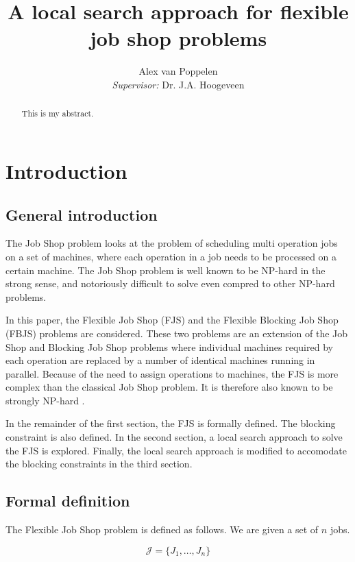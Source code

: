 \documentclass[a4paper,10pt]{article}
\title{A local search approach for flexible job shop problems}
\author{Alex van Poppelen\smallskip\\
\emph{Supervisor:} Dr. J.A. Hoogeveen}
\begin{document}
\maketitle

\begin{abstract}

This is my abstract.

\end{abstract}

\tableofcontents

\section{Introduction}

\subsection{General introduction}

The Job Shop problem looks at the problem of scheduling multi operation jobs on a set of machines, where each operation in a job needs to be processed on a certain machine. The Job Shop problem is well known to be NP-hard in the strong sense, and notoriously difficult to solve even compred to other NP-hard problems.

In this paper, the Flexible Job Shop (FJS) and the Flexible Blocking Job Shop (FBJS) problems are considered. These two problems are an extension of the Job Shop and Blocking Job Shop problems where individual machines required by each operation are replaced by a number of identical machines running in parallel. Because of the need to assign operations to machines, the FJS is more complex than the classical Job Shop problem. It is therefore also known to be strongly NP-hard \cite{approxfjsp}.

In the remainder of the first section, the FJS is formally defined. The blocking constraint is also defined. In the second section, a local search approach to solve the FJS is explored. Finally, the local search approach is modified to accomodate the blocking constraints in the third section.

\subsection{Formal definition}

The Flexible Job Shop problem is defined as follows. We are given a set of $n$ jobs.

\[ \mathcal{J} = \{J_1, \dots, J_n\} \]
\end{document}
